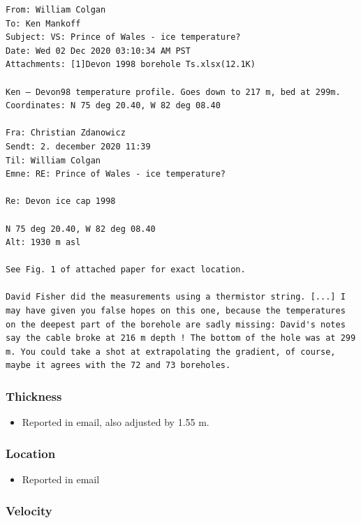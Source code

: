 \documentclass[article,a4paper,times,11pt,twoside]{article}
\begin{document}
\begin{verbatim}
From: William Colgan
To: Ken Mankoff
Subject: VS: Prince of Wales - ice temperature?
Date: Wed 02 Dec 2020 03:10:34 AM PST
Attachments: [1]Devon 1998 borehole Ts.xlsx(12.1K)

Ken – Devon98 temperature profile. Goes down to 217 m, bed at 299m.
Coordinates: N 75 deg 20.40, W 82 deg 08.40

Fra: Christian Zdanowicz
Sendt: 2. december 2020 11:39
Til: William Colgan
Emne: RE: Prince of Wales - ice temperature?

Re: Devon ice cap 1998

N 75 deg 20.40, W 82 deg 08.40
Alt: 1930 m asl

See Fig. 1 of attached paper for exact location.

David Fisher did the measurements using a thermistor string. [...] I
may have given you false hopes on this one, because the temperatures
on the deepest part of the borehole are sadly missing: David's notes
say the cable broke at 216 m depth ! The bottom of the hole was at 299
m. You could take a shot at extrapolating the gradient, of course,
maybe it agrees with the 72 and 73 boreholes.
\end{verbatim}

\subsubsection{Thickness}
\label{sec:orgeee6047}

\begin{itemize}
\item Reported in email, also adjusted by 1.55 m.
\end{itemize}

\subsubsection{Location}
\label{sec:org95505d0}

\begin{itemize}
\item Reported in email
\end{itemize}

\subsubsection{Velocity}
\label{sec:org3af8285}
\clearpage
\end{document}
